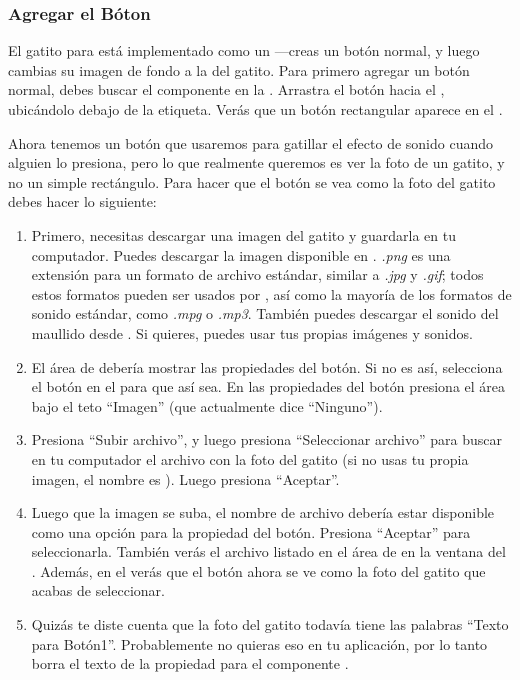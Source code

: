 \documentclass[letterpaper]{article}
\begin{document}
\subsubsection*{Agregar el Bóton}
El gatito para  está implementado como un
---creas un botón normal, y luego cambias su imagen
de fondo a la del gatito. Para primero agregar un botón normal, debes
buscar el componente  en la \palette. Arrastra el
botón hacia el \viewer, ubicándolo debajo de la etiqueta. Verás que un
botón rectangular aparece en el \viewer.

Ahora tenemos un botón que usaremos para gatillar el efecto de sonido
cuando alguien lo presiona, pero lo que realmente queremos es ver la
foto de un gatito, y no un simple rectángulo. Para hacer que el botón
se vea como la foto del gatito debes hacer lo siguiente:

\begin{enumerate}

\item Primero, necesitas descargar una imagen del gatito y guardarla
  en tu computador. Puedes descargar la imagen disponible en
  . \emph{.png} es una
  extensión para un formato de archivo estándar, similar a \emph{.jpg}
  y \emph{.gif}; todos estos formatos pueden ser usados por
  \AppInventor, así como la mayoría de los formatos de sonido
  estándar, como \emph{.mpg} o \emph{.mp3}. También puedes descargar
  el sonido del maullido desde
  . Si quieres, puedes usar
  tus propias imágenes y sonidos.

\item El área de \properties debería mostrar las propiedades del
  botón. Si no es así, selecciona el botón en el \viewer para que así
  sea. En las propiedades del botón presiona el área bajo el teto
  ``Imagen'' (que actualmente dice ``Ninguno'').

\item Presiona ``Subir archivo'', y luego presiona ``Seleccionar
  archivo'' para buscar en tu computador el archivo con la foto del
  gatito (si no usas tu propia imagen, el nombre es
  ). Luego presiona ``Aceptar''.

\item Luego que la imagen se suba, el nombre de archivo debería estar
  disponible como una opción para la propiedad  del
  botón. Presiona ``Aceptar'' para seleccionarla. También verás el
  archivo listado en el área de \media en la ventana del
  \designer. Además, en el \designer verás que el botón ahora se ve
  como la foto del gatito que acabas de seleccionar.

\item Quizás te diste cuenta que la foto del gatito todavía tiene las
  palabras ``Texto para Botón1''. Probablemente no quieras eso en tu
  aplicación, por lo tanto borra el texto de la propiedad
   para el componente .

\end{enumerate}
\end{document}
